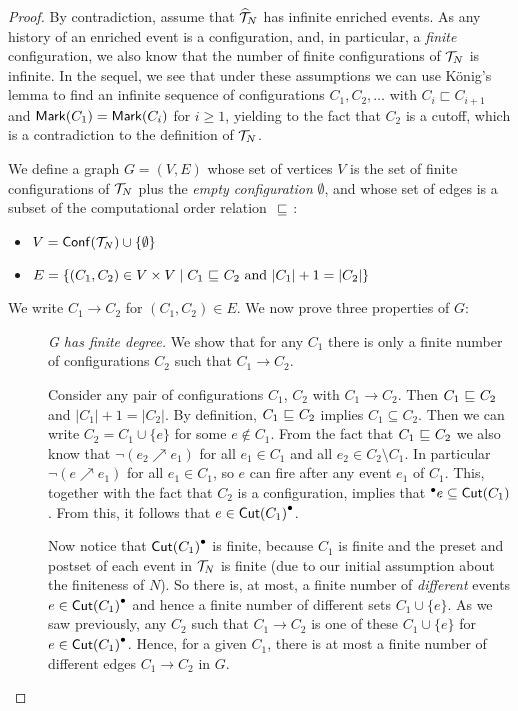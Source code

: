 \begin{proof}
By contradiction, assume that $\widehat{\mathcal{T}}_{N}$ has infinite enriched events. As any
history of an enriched event is a configuration, and, in particular, a
\emph{finite} configuration, we also know that the number of finite
configurations of $\mathcal{T}_{N}$ is infinite.  In the sequel, we see that under
these assumptions we can use K\"{o}nig's lemma to find an infinite sequence of
configurations $C_1, C_2, \ldots$ with $C_i \sqsubset C_{i+1}$ and
$\mathsf{Mark }{(C_1)} = \mathsf{Mark }{(C_i)}$ for $i \ge 1$, yielding to the fact that $C_2$
is a cutoff, which is a contradiction to the definition of $\mathcal{T}_{N}$.

We define a graph $G = (V, E)$ whose set of vertices $V$ is the set of finite
configurations of $\mathcal{T}_{N}$ plus the \textit{empty configuration}
$\emptyset$, and whose set of edges is a subset of the computational order
relation ${\ \sqsubseteq \ }$:

\begin{itemize}
\item $V = \mathsf{Conf}(\mathcal{T}_{N}) \cup \{\emptyset\}$
\item $E = \{(C_1, C_2) \in V \times V \mid C_1 {\ \sqsubseteq \ } C_2 \text{ and }
|C_1| + 1 = |C_2|\}$
\end{itemize}

We write $C_1 \to C_2$ for $(C_1, C_2) \in E$.  We now prove three properties
of $G$:

\begin{description}
\item[] \emph{G has finite degree.}  We show that for any $C_1$ there is only a
finite number of configurations $C_2$ such that $C_1 \to C_2$.

Consider any pair of configurations $C_1$, $C_2$ with $C_1 \to C_2$.  Then $C_1
{\ \sqsubseteq \ } C_2$ and $|C_1| + 1 = |C_2|$.  By definition, $C_1 {\ \sqsubseteq \ } C_2$
implies $C_1 \subseteq C_2$.  Then we can write $C_2 = C_1 \cup \{e\}$ for some
$e \notin C_1$.  From the fact that $C_1 {\ \sqsubseteq \ } C_2$ we also know that
$\lnot (e_2 \nearrow e_1)$ for all $e_1 \in C_1$ and all $e_2 \in C_2 \setminus
C_1$.  In particular $\lnot (e \nearrow e_1)$ for all $e_1 \in C_1$, so $e$ can
fire after any event $e_1$ of $C_1$.  This, together with the fact that $C_2$
is a configuration, implies that ${}^\bullet e \subseteq \mathsf{Cut }{(C_1)}$. From this, it
follows that $e \in \mathsf{Cut }{(C_1)}^\bullet$.

Now notice that $\mathsf{Cut }{(C_1)}^\bullet$ is finite, because $C_1$ is finite and the
preset and postset of each event in $\mathcal{T}_{N}$ is finite (due to our initial
assumption about the finiteness of $N$).  So there is, at most, a finite number
of \emph{different} events $e \in \mathsf{Cut }{(C_1)}^\bullet$ and hence a finite number
of different sets $C_1 \cup \{e\}$.  As we saw previously, any $C_2$ such that
$C_1 \to C_2$ is one of these $C_1 \cup \{e\}$ for $e \in \mathsf{Cut }{(C_1)}^\bullet$.
Hence, for a given $C_1$, there is at most a finite number of different edges
$C_1 \to C_2$ in $G$.


\end{description}
\end{proof}
